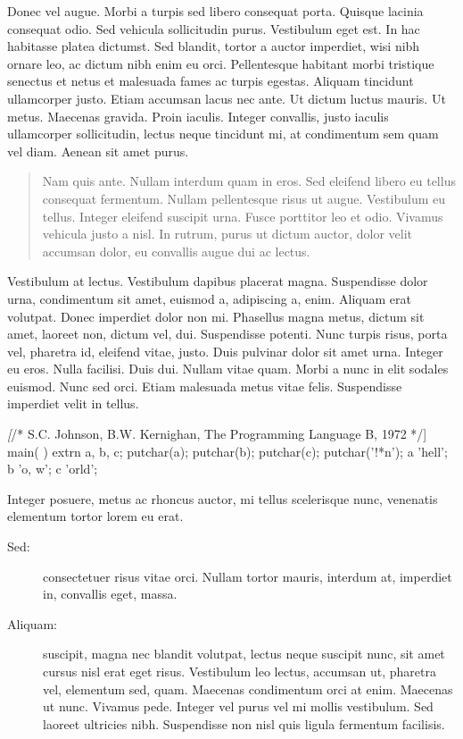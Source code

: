 \documentclass[cfonts]{nostarch}
\begin{document}
Donec vel augue. Morbi a turpis sed libero consequat porta. Quisque
lacinia consequat odio. Sed vehicula sollicitudin purus. Vestibulum
eget est. In hac habitasse platea dictumst. Sed blandit, tortor a
auctor imperdiet, wisi nibh ornare leo, ac dictum nibh enim eu orci.
Pellentesque habitant morbi tristique senectus et netus et malesuada
fames ac turpis egestas.  Aliquam tincidunt ullamcorper justo. Etiam
accumsan lacus nec ante.  Ut dictum luctus mauris. Ut metus. Maecenas
gravida. Proin iaculis.  Integer convallis, justo iaculis ullamcorper
sollicitudin, lectus neque tincidunt mi, at condimentum sem quam vel
diam. Aenean sit amet purus.
\begin{quote}
  Nam quis ante. Nullam interdum quam in eros.  Sed eleifend libero eu
  tellus consequat fermentum. Nullam pellentesque risus ut augue.
  Vestibulum eu tellus. Integer eleifend suscipit urna. Fusce
  porttitor leo et odio. Vivamus vehicula justo a nisl. In rutrum,
  purus ut dictum auctor, dolor velit accumsan dolor, eu convallis
  augue dui ac lectus. 
\end{quote}

Vestibulum at lectus. Vestibulum dapibus placerat magna. Suspendisse
dolor urna, condimentum sit amet, euismod a, adipiscing a, enim.
Aliquam erat volutpat. Donec imperdiet dolor non mi. Phasellus magna
metus, dictum sit amet, laoreet non, dictum vel, dui. Suspendisse
potenti. Nunc turpis risus, porta vel, pharetra id, eleifend vitae,
justo. Duis pulvinar dolor sit amet urna. Integer eu eros. Nulla
facilisi. Duis dui.  Nullam vitae quam. Morbi a nunc in elit sodales
euismod. Nunc sed orci. Etiam malesuada metus vitae felis. Suspendisse
imperdiet velit in tellus.
\begin{quotation}
\lipsum[40-41]  
\end{quotation}
\lipsum[63-65]
\begin{Code}[commandchars=\\\[\]]
\textit[/* S.C. Johnson, B.W. Kernighan, The Programming Language B, 1972 */]
main( ) {
   extrn a, b, c;
   putchar(a); putchar(b); putchar(c); putchar('!*n');
 }
 a 'hell';
 b 'o, w';
 c 'orld';  
\end{Code}


Integer posuere, metus ac rhoncus auctor, mi tellus scelerisque nunc,
venenatis elementum tortor lorem eu erat.  
\begin{description}
\item[Sed:] consectetuer risus
vitae orci. Nullam tortor mauris, interdum at, imperdiet in, convallis
eget, massa. 
\item[Aliquam:] suscipit, magna nec blandit volutpat, lectus
neque suscipit nunc, sit amet cursus nisl erat eget risus. Vestibulum
leo lectus, accumsan ut, pharetra vel, elementum sed, quam. Maecenas
condimentum orci at enim. Maecenas ut nunc. Vivamus pede. Integer vel
purus vel mi mollis vestibulum. Sed laoreet ultricies nibh.
Suspendisse non nisl quis ligula fermentum facilisis. 
\end{description}
\lipsum[37]
\end{document}
